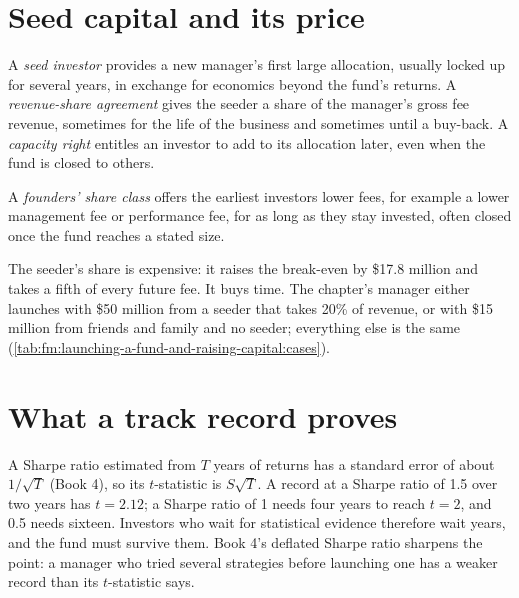 \label{lst:fm:launching-a-fund-and-raising-capital:model}

\section{Seed capital and its price}

\begin{definition}\label{def:fm:launching-a-fund-and-raising-capital:seed}
A \emph{seed investor} provides a new manager's first large allocation, usually locked up for several years, in exchange for
economics beyond the fund's returns. A \emph{revenue-share agreement} gives the seeder a share of the manager's gross
fee revenue, sometimes for the life of the business and sometimes until a buy-back. A \emph{capacity right} entitles an
investor to add to its allocation later, even when the fund is closed to others.
\end{definition}

\begin{definition}\label{def:fm:launching-a-fund-and-raising-capital:founders}
A \emph{founders' share class} offers the earliest investors lower fees, for example a lower management fee or
performance fee, for as long as they stay invested, often closed once the fund reaches a stated size.
\end{definition}

The seeder's share is expensive: it raises the break-even by \$17.8 million and takes a fifth of every future fee. It buys time. The chapter's manager
either launches with \$50 million from a seeder that takes 20\% of revenue, or with \$15 million from friends and family and no seeder; everything
else is the same (\cref{tab:fm:launching-a-fund-and-raising-capital:cases}).

\section{What a track record proves}

A Sharpe ratio estimated from $T$ years of returns has a standard error of about $1/\sqrt T$ (Book 4), so its $t$-statistic is $S\sqrt T$. A record
at a Sharpe ratio of 1.5 over two years has $t=2.12$; a Sharpe ratio of 1 needs four years to reach $t=2$, and 0.5 needs sixteen. Investors who
wait for statistical evidence therefore wait years, and the fund must survive them. Book 4's deflated Sharpe ratio sharpens the point: a manager who
tried several strategies before launching one has a weaker record than its $t$-statistic says.

